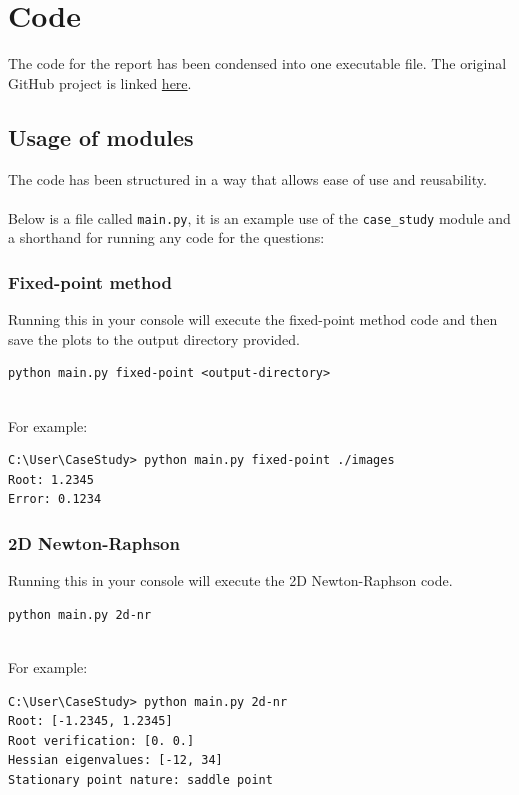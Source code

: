 \documentclass[../main.tex]{subfiles}
\begin{document}
    \section{Code}\label{sec:code}

    The code for the report has been condensed into one executable file.
    The original GitHub project is linked \href{https://github.com/TheSilverLeopard/University/tree/projects/MTH2005%20Modelling%20-%20Theory%20and%20Practice/Coursework%201}
    {here}.

    \subsection*{Usage of modules}\label{subsec:usage-of-modules}
    The code has been structured in a way that allows ease of use and reusability. \\
    \\
    Below is a file called \texttt{main.py}, it is an example use of the \texttt{case\_study} module and a shorthand for
    running any code for the questions:
    

    \subsubsection{Fixed-point method}\label{subsubsec:fixed-point-method-appendix}
    Running this in your console will execute the fixed-point method code and
    then save the plots to the output directory provided.
    \begin{lstlisting}[style=console,label={lst:appendix-fixed-point-usage}]
python main.py fixed-point <output-directory>
    \end{lstlisting}
    \\
    For example:
    \begin{lstlisting}[style=console,label={lst:appendix-fixed-point-example}]
C:\User\CaseStudy> python main.py fixed-point ./images
Root: 1.2345
Error: 0.1234
    \end{lstlisting}

    \subsubsection{2D Newton-Raphson}\label{subsubsec:2d-nr-appendix}
    Running this in your console will execute the 2D Newton-Raphson code.
    \begin{lstlisting}[style=console,label={lst:appendix-2d-nr-usage}]
python main.py 2d-nr
    \end{lstlisting}
    \\
    For example:
    \begin{lstlisting}[style=console,label={lst:appendix-2d-nr-example}]
C:\User\CaseStudy> python main.py 2d-nr
Root: [-1.2345, 1.2345]
Root verification: [0. 0.]
Hessian eigenvalues: [-12, 34]
Stationary point nature: saddle point
    \end{lstlisting}
\end{document}
